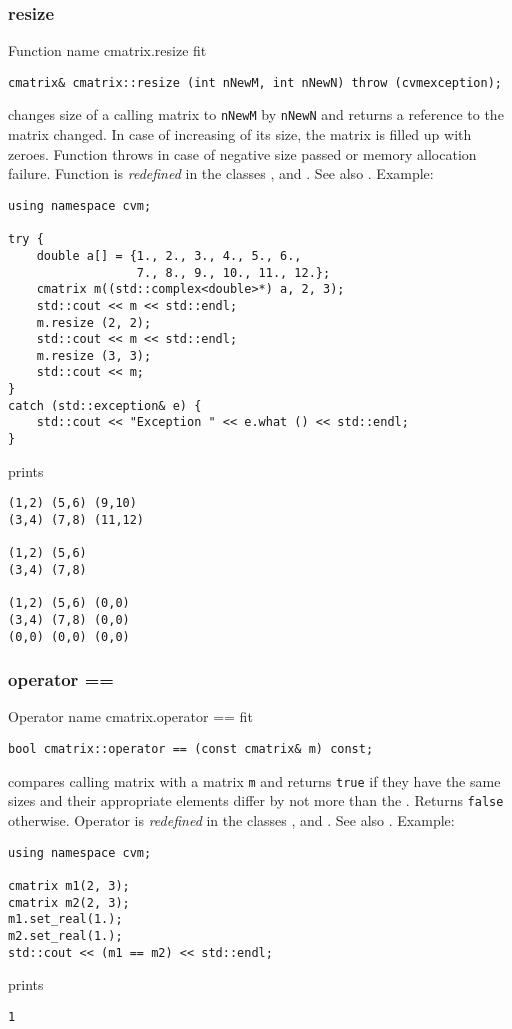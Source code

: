 \subsubsection{resize}
Function%
\pdfdest name {cmatrix.resize} fit
\begin{verbatim}
cmatrix& cmatrix::resize (int nNewM, int nNewN) throw (cvmexception);
\end{verbatim}
changes  size of a calling matrix to \verb"nNewM" by \verb"nNewN"
and returns a reference to
the matrix changed. In case of increasing of its size, the matrix
is filled up with zeroes.
Function throws  
in case of negative size passed or memory allocation failure.
Function is \emph{redefined} in the classes
,  
and .
See also .
Example:
\begin{Verbatim}
using namespace cvm;

try {
    double a[] = {1., 2., 3., 4., 5., 6.,
                  7., 8., 9., 10., 11., 12.};
    cmatrix m((std::complex<double>*) a, 2, 3);
    std::cout << m << std::endl;
    m.resize (2, 2);
    std::cout << m << std::endl;
    m.resize (3, 3);
    std::cout << m;
}
catch (std::exception& e) {
    std::cout << "Exception " << e.what () << std::endl;
}
\end{Verbatim}
prints
\begin{Verbatim}
(1,2) (5,6) (9,10)
(3,4) (7,8) (11,12)

(1,2) (5,6)
(3,4) (7,8)

(1,2) (5,6) (0,0)
(3,4) (7,8) (0,0)
(0,0) (0,0) (0,0)
\end{Verbatim}
\newpage



\subsubsection{operator ==}
Operator%
\pdfdest name {cmatrix.operator ==} fit
\begin{verbatim}
bool cmatrix::operator == (const cmatrix& m) const;
\end{verbatim}
compares  calling matrix with a matrix \verb"m"
and returns \verb"true" if they have the same sizes
and their appropriate elements differ by not more than the
.
Returns \verb"false" otherwise.
Operator is \emph{redefined} in the classes
,  
and .
See also .
Example:
\begin{Verbatim}
using namespace cvm;

cmatrix m1(2, 3);
cmatrix m2(2, 3);
m1.set_real(1.);
m2.set_real(1.);
std::cout << (m1 == m2) << std::endl;
\end{Verbatim}
prints
\begin{Verbatim}
1
\end{Verbatim}
\newpage



